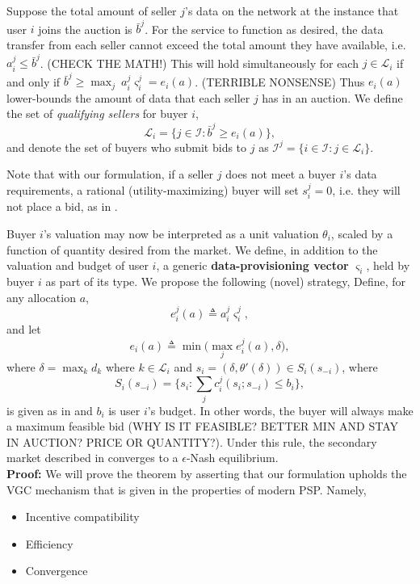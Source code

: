 \documentclass[12pt]{article}
\theoremstyle{definition}
\newcommand{\vs}{\varsigma}
\newcommand{\mcL}{\mathcal{L}}
\newcommand{\mcI}{\mathcal{I}}
\begin{document}
\begin{multicols}{2}
Suppose the total amount of seller $j$'s data on the network at the instance that
user $i$ joins the auction is $\bar{b}^j$. For the service to function as desired,
the data transfer from each seller cannot exceed the total amount they have available,
i.e. $a_i^j \le \bar{b}^j$. (CHECK THE MATH!) This will hold simultaneously for each $j \in
\mcL_i$ if and only if $\bar{b}^j \ge \max_j \ a_i^j \vs_i^j = e_i(a)$.
(TERRIBLE NONSENSE) Thus $e_i(a)$
lower-bounds the amount of data that each seller $j$ has in an auction.
We define the set of \emph{qualifying sellers} for buyer $i$,
\begin{equation}\label{sellers}
     \mcL_i = \lbrace j \in \mcI : \bar{b}^j \ge e_i(a) \rbrace,
\end{equation}
and denote the set of buyers who submit bids to $j$ as $\mcI^j = \lbrace i\in\mcI : j \in
\mcL_i\rbrace.$

Note that with our formulation, if a seller $j$ does not meet a buyer $i$'s data requirements, a
rational (utility-maximizing) buyer will set $s_i^j = 0$, i.e. they will not
place a bid, as in \cite{zheng}. 

Buyer $i$'s valuation may now be interpreted as a unit valuation $\theta_i$, scaled
by a function of quantity desired from the market. 
We define, in addition to the valuation and budget of user $i$, a generic
\textbf{data-provisioning vector} $\vs_i$, held by buyer $i$ as part of its type. We propose the
following (novel) strategy,
{
\label{strategy}
Define, for any allocation $a$,
\begin{equation}\label{opt-out}
    e_i^j(a) \triangleq a_i^j\vs_i^j,
\end{equation}
and let
\begin{equation}
    e_i(a) \triangleq \min\bigg(\max_j e_i^j(a), \delta\bigg),
\end{equation}
where $\delta = \max_k d_k$ where $k\in \mcL_i$ and $s_i = (\delta,
\theta'(\delta)) \in S_i(s_{-i})$, where 
$$
    S_i(s_{-i}) = \bigg\lbrace s_i : \displaystyle\sum_j c_i^j(s_i;s_{-i}) \le b_i\bigg\rbrace,
$$
is given as in \cite{lazar} and $b_i$ is user $i$'s budget. In other words, the
buyer will always make a maximum feasible bid (WHY IS IT FEASIBLE? BETTER MIN
AND STAY IN AUCTION? PRICE OR QUANTITY?). 
Under this rule, the secondary market described in \cite{zheng} converges to a $\epsilon$-Nash equilibrium.
}\\
\textbf{Proof:}
We will prove the theorem by asserting that our formulation upholds the VGC
mechanism that is given in the properties of modern PSP. Namely,
\begin{itemize}
    \item Incentive compatibility
    \item Efficiency 
    \item Convergence
\end{itemize}


\end{multicols}
\end{document}
